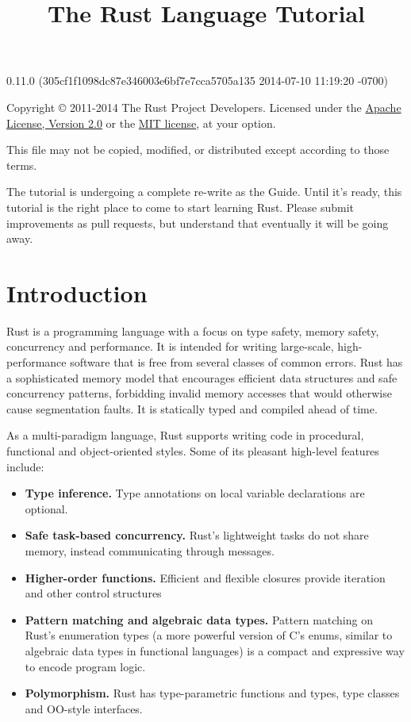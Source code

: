 \documentclass[]{article}
\title{The Rust Language Tutorial}
\begin{document}
\maketitle

0.11.0 (305cf1f1098dc87e346003e6bf7e7cca5705a135 2014-07-10 11:19:20 -0700)

Copyright © 2011-2014 The Rust Project Developers. Licensed under the
\href{http://www.apache.org/licenses/LICENSE-2.0}{Apache License,
Version 2.0} or the \href{http://opensource.org/licenses/MIT}{MIT
license}, at your option.

This file may not be copied, modified, or distributed except according
to those terms.

{
\hypersetup{linkcolor=black}
\setcounter{tocdepth}{3}
\tableofcontents
}
The tutorial is undergoing a complete re-write as the Guide. Until it's
ready, this tutorial is the right place to come to start learning Rust.
Please submit improvements as pull requests, but understand that
eventually it will be going away.

\section{Introduction}\label{introduction}

Rust is a programming language with a focus on type safety, memory
safety, concurrency and performance. It is intended for writing
large-scale, high-performance software that is free from several classes
of common errors. Rust has a sophisticated memory model that encourages
efficient data structures and safe concurrency patterns, forbidding
invalid memory accesses that would otherwise cause segmentation faults.
It is statically typed and compiled ahead of time.

As a multi-paradigm language, Rust supports writing code in procedural,
functional and object-oriented styles. Some of its pleasant high-level
features include:

\begin{itemize}
\itemsep1pt\parskip0pt
\item
  \textbf{Type inference.} Type annotations on local variable
  declarations are optional.
\item
  \textbf{Safe task-based concurrency.} Rust's lightweight tasks do not
  share memory, instead communicating through messages.
\item
  \textbf{Higher-order functions.} Efficient and flexible closures
  provide iteration and other control structures
\item
  \textbf{Pattern matching and algebraic data types.} Pattern matching
  on Rust's enumeration types (a more powerful version of C's enums,
  similar to algebraic data types in functional languages) is a compact
  and expressive way to encode program logic.
\item
  \textbf{Polymorphism.} Rust has type-parametric functions and types,
  type classes and OO-style interfaces.
\end{itemize}
\end{document}
